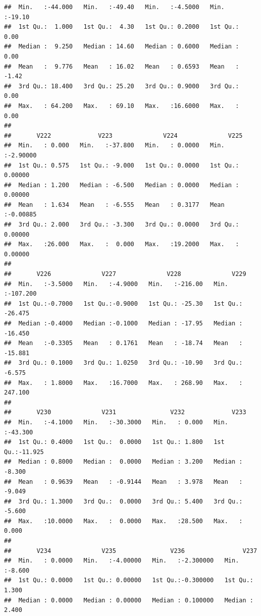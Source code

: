 \documentclass[
]{article}
\begin{document}
\begin{verbatim}
##  Min.   :-44.000   Min.   :-49.40   Min.   :-4.5000   Min.   :-19.10  
##  1st Qu.:  1.000   1st Qu.:  4.30   1st Qu.: 0.2000   1st Qu.:  0.00  
##  Median :  9.250   Median : 14.60   Median : 0.6000   Median :  0.00  
##  Mean   :  9.776   Mean   : 16.02   Mean   : 0.6593   Mean   : -1.42  
##  3rd Qu.: 18.400   3rd Qu.: 25.20   3rd Qu.: 0.9000   3rd Qu.:  0.00  
##  Max.   : 64.200   Max.   : 69.10   Max.   :16.6000   Max.   :  0.00  
##                                                                       
##       V222             V223              V224              V225         
##  Min.   : 0.000   Min.   :-37.800   Min.   : 0.0000   Min.   :-2.90000  
##  1st Qu.: 0.575   1st Qu.: -9.000   1st Qu.: 0.0000   1st Qu.: 0.00000  
##  Median : 1.200   Median : -6.500   Median : 0.0000   Median : 0.00000  
##  Mean   : 1.634   Mean   : -6.555   Mean   : 0.3177   Mean   :-0.00885  
##  3rd Qu.: 2.000   3rd Qu.: -3.300   3rd Qu.: 0.0000   3rd Qu.: 0.00000  
##  Max.   :26.000   Max.   :  0.000   Max.   :19.2000   Max.   : 0.00000  
##                                                                         
##       V226              V227              V228              V229         
##  Min.   :-3.5000   Min.   :-4.9000   Min.   :-216.00   Min.   :-107.200  
##  1st Qu.:-0.7000   1st Qu.:-0.9000   1st Qu.: -25.30   1st Qu.: -26.475  
##  Median :-0.4000   Median :-0.1000   Median : -17.95   Median : -16.450  
##  Mean   :-0.3305   Mean   : 0.1761   Mean   : -18.74   Mean   : -15.881  
##  3rd Qu.: 0.1000   3rd Qu.: 1.0250   3rd Qu.: -10.90   3rd Qu.:  -6.575  
##  Max.   : 1.8000   Max.   :16.7000   Max.   : 268.90   Max.   : 247.100  
##                                                                          
##       V230              V231               V232             V233        
##  Min.   :-4.1000   Min.   :-30.3000   Min.   : 0.000   Min.   :-43.300  
##  1st Qu.: 0.4000   1st Qu.:  0.0000   1st Qu.: 1.800   1st Qu.:-11.925  
##  Median : 0.8000   Median :  0.0000   Median : 3.200   Median : -8.300  
##  Mean   : 0.9639   Mean   : -0.9144   Mean   : 3.978   Mean   : -9.049  
##  3rd Qu.: 1.3000   3rd Qu.:  0.0000   3rd Qu.: 5.400   3rd Qu.: -5.600  
##  Max.   :10.0000   Max.   :  0.0000   Max.   :28.500   Max.   :  0.000  
##                                                                         
##       V234              V235               V236                V237       
##  Min.   : 0.0000   Min.   :-4.00000   Min.   :-2.300000   Min.   :-8.600  
##  1st Qu.: 0.0000   1st Qu.: 0.00000   1st Qu.:-0.300000   1st Qu.: 1.300  
##  Median : 0.0000   Median : 0.00000   Median : 0.100000   Median : 2.400  

\end{verbatim}
\end{document}
